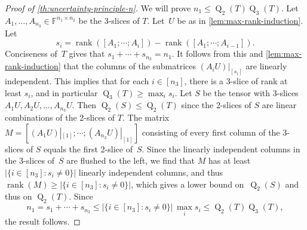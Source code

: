 \documentclass{daj}
\DeclareMathOperator{\subrank}{Q}
\newcommand{\FF}{\mathbb{F}}
\DeclareMathOperator{\rank}{rank} \DeclareMathOperator{\col}{colspan}
\begin{document}
\begin{proof}[Proof of \autoref{th:uncertainty-principle-n}]
We will prove $n_1 \leq \subrank_2(T) \subrank_3(T)$.
Let $A_1, \ldots, A_{n_3} \in \FF^{n_1 \times n_2}$ be the $3$-slices of $T$.
Let~$U$ be as in \autoref{lem:max-rank-induction}.
Let 
\[
s_i = \rank([A_1; \cdots ; A_{i}]) - \rank([A_1; \cdots ; A_{i-1}]).
\]
Conciseness of~$T$ gives that $s_1 + \cdots + s_{n_3} = n_1$.
It follows from this and \autoref{lem:max-rank-induction} that the columns of the submatrices $(A_iU)|_{[s_i]}$ are linearly independent.
This implies that for each $i\in[n_3]$, 
there is a 3-slice of rank at least $s_i$,
%
and in particular $\subrank_3(T)\geq\max_i s_i$. %
%
Let $S$ be the tensor with 3-slices $A_1U, A_2U, \ldots, A_{n_3}U$. Then $\subrank_2(S) \leq \subrank_2(T)$ since the 2-slices of $S$ are linear combinations of the 2-slices of $T$. 
The matrix $M = [(A_1U)|_{[1]};\cdots ; (A_{n_3}U)|_{[1]}]$ consisting of every first column of the 3-slices of $S$ equals the first 2-slice of~$S$. Since the linearly independent columns in the 3-slices of~$S$ are flushed to the left, we find that $M$ has at least $|\{i\in [n_3]: s_i\ne 0\}|$ linearly independent columns, and thus $\rank(M) \geq |\{i\in [n_3]: s_i\ne 0\}|$,
%
%
which gives a lower bound on~$\subrank_2(S)$ and thus on $\subrank_2(T)$.
Since
\[
n_1  = s_1 + \cdots + s_{n_3}\leq |\{i\in [n_3]: s_i\ne 0\}|\, \max_i s_i \leq \subrank_2(T) \subrank_3(T),
\]
the result follows. %
%
%
%
%
%
%
%
%
%
%
%
\end{proof}

%
%
%

%
%

\newcommand{\yesTextColour}{green!60!black}
\newcommand{\noTextColour}{red!60!black}
%
%
%
%
%
%

%

%
%
%

%
%
%

%
%
%
%
%
%
%
%

\newcommand{\yesCellColour}{green!20}
\newcommand{\noCellColour}{red!20}
%
%
%
%
%
%
%
%
%
%
%
%
%
%
%
%

%
%
%

%
%

%
%

%

%
%

%
\end{document}
